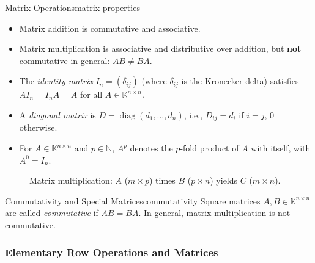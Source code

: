 \begin{property}{Matrix Operations}{matrix-properties}
    \begin{itemize}[nosep]
        \item Matrix addition is commutative and associative.
        \item Matrix multiplication is associative and distributive over addition, but \textbf{not} commutative in general: \(AB \neq BA\).
        \item The \emph{identity matrix} \(I_n = (\delta_{ij})\) (where \(\delta_{ij}\) is the Kronecker delta) satisfies \(AI_n = I_nA = A\) for all \(A \in \mathbb{K}^{n \times n}\).
        \item A \emph{diagonal matrix} is \(D = \operatorname{diag}(d_1,\ldots,d_n)\), i.e., \(D_{ij} = d_i\) if \(i=j\), \(0\) otherwise.
        \item For \(A \in \mathbb{K}^{n \times n}\) and \(p \in \mathbb{N}\), \(A^p\) denotes the \(p\)-fold product of \(A\) with itself, with \(A^0 = I_n\).
    \end{itemize}
\end{property}

\begin{figure}[H]
    \centering
    \caption{Matrix multiplication: \(A\) (\(m \times p\)) times \(B\) (\(p \times n\)) yields \(C\) (\(m \times n\)).}
\end{figure}

\begin{remark}{Commutativity and Special Matrices}{commutativity}
    Square matrices \(A,B \in \mathbb{K}^{n \times n}\) are called \emph{commutative} if \(AB = BA\). In general, matrix multiplication is not commutative.
\end{remark}

\subsubsection{Elementary Row Operations and Matrices}

